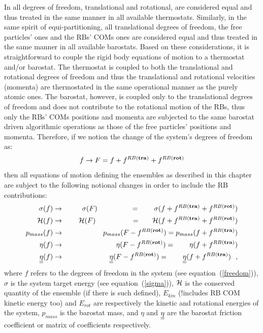 In \D all degrees of freedom, translational and rotational, are considered equal
and thus treated in the same manner in all available thermostats.  Similarly, in
the same spirit of equi-partitioning, all translational degrees of freedom,  the
free particles' ones and the RBs' COMs ones are considered equal and thus treated
in the same manner in all available barostats.  Based on these considerations, it
is straightforward to couple the rigid body equations of motion to a
thermostat and/or barostat.  The thermostat is
coupled to both the translational and rotational degrees of freedom and thus the
translational and rotational velocities (momenta) are thermostated in the same
operational manner as the purely atomic ones.  The barostat, however, is coupled
only to the translational degrees of freedom and does not contribute to the
rotational motion of the RBs, thus only the RBs' COMs positions and momenta are
subjected to the same barostat driven algorithmic operations as those of the
free particles' positions and momenta.  Therefore, if we notion the change of
the system's degrees of freedom as:
\begin{equation}
f \rightarrow F = f + f^{RB {\bf (tra)}} + f^{RB {\bf (rot)}}
\end{equation}
then all equations of motion defining the ensembles as described in this chapter are
subject to the following notional changes in order to include the RB contributions:
\begin{eqnarray}
\sigma(f) &\rightarrow& ~~~~~\sigma(F) ~~~~~~~~~~~~~~= ~~~~~~\sigma(f + f^{RB {\bf (tra)}} + f^{RB {\bf (rot)}}) \nonumber \\
{\cal H}(f) &\rightarrow& ~~~~{\cal H}(F) ~~~~~~~~~~~~~~~= ~~~~~{\cal H}(f + f^{RB {\bf (tra)}} + f^{RB {\bf (rot)}}) \nonumber \\
p_{mass}(f) &\rightarrow& p_{mass}(F - f^{RB {\bf (rot)}}) = p_{mass}(f + f^{RB {\bf (tra)}}) \\
\eta(f) &\rightarrow& ~~~~~\eta(F - f^{RB {\bf (rot)}}) = ~~~~~~\eta(f + f^{RB {\bf (tra)}}) \nonumber \\
\mbox{$\underline{\underline{\bf \eta}}$}(f) &\rightarrow& ~~~~~\mbox{$\underline{\underline{\bf \eta}}$}(F - f^{RB {\bf (rot)}}) = ~~~~~~\mbox{$\underline{\underline{\bf \eta}}$}(f + f^{RB {\bf (tra)}})~~, \nonumber
\end{eqnarray}
where $f$ refers to the degrees of freedom in the system (see equation~(\ref{freedom})),
$\sigma$ is the system target energy (see equation~(\ref{sigma})), ${\cal H}$ is the
conserved quantity of the ensemble (if there is such defined), $E_{kin}$ (!includes
RB COM kinetic energy too) and $E_{rot}$ are respectively the kinetic and rotational
energies of the system, $p_{mass}$ is the barostat mass, and $\eta$ and $\mbox{$\underline{\underline{\bf \eta}}$}$
are the barostat friction coefficient or matrix of coefficients respectively.

